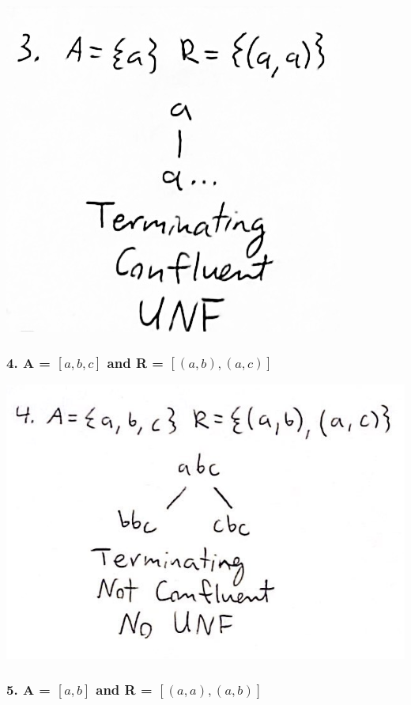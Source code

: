 \documentclass{article}
\theoremstyle{theorem}
\theoremstyle{definition}
\theoremstyle{remark}
\begin{document}
  \begin{center}
    \includegraphics*[scale=0.25]{ars3.jpg}
    \end{center}

  \subsubsection*{4. A = $\left[a,b,c\right]$ and R = $\left[(a,b),(a,c)\right]$}

    \begin{center}
      \includegraphics*[scale=0.25]{ars4.jpg}
      \end{center}

  \subsubsection*{5. A = $\left[a,b\right]$ and R = $\left[(a,a),(a,b)\right]$}
\end{document}
